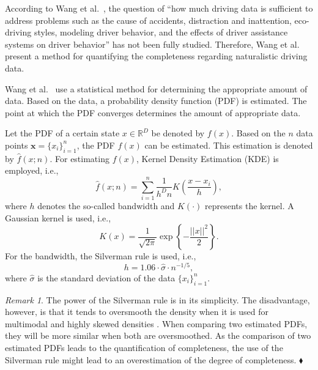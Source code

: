 \documentclass[10pt,final,a4paper,oneside,onecolumn]{article}
\newcommand*{\etal}{et al.}                                     %
\theoremstyle{plain}\newtheorem{definition}{Definition}[section]    %
\theoremstyle{definition}\newtheorem{example}{Example}[section]     %
\theoremstyle{remark}\newtheorem{remarkenv}{Remark}[section]        %
\newenvironment{remark}{\begin{remarkenv}}%
                       {\hfill$\blacklozenge$\end{remarkenv}}       %
\begin{document}
According to Wang \etal\ \cite{wang2017much}, the question of ``how much driving data is sufficient to address problems such as the cause of accidents, distraction and inattention, eco-driving styles, modeling driver behavior, and the effects of driver assistance systems on driver behavior'' has not been fully studied. Therefore, Wang \etal\ \cite{wang2017much} present a method for quantifying the completeness regarding naturalistic driving data. 

Wang \etal\ \cite{wang2017much} use a statistical method for determining the appropriate amount of data. Based on the data, a probability density function (PDF) is estimated. The point at which the PDF converges determines the amount of appropriate data. 

Let the PDF of a certain state $x \in \mathds{R}^D$ be denoted by $f(x)$. Based on the $n$ data points $\textbf{x}=\{x_i\}_{i=1}^n$, the PDF $f(x)$ can be estimated. This estimation is denoted by $\hat{f}(x;n)$. For estimating $f(x)$, Kernel Density Estimation (KDE) \cite{rosenblatt1956remarks, parzen1962estimation} is employed, i.e.,
\begin{equation} \label{eq:kde}
	\hat{f}(x;n) = \sum_{i=1}^n \frac{1}{h^D n} K \left( \frac{x - x_i}{h} \right),
\end{equation}
where $h$ denotes the so-called bandwidth and $K(\cdot)$ represents the kernel. A Gaussian kernel is used, i.e.,
\begin{equation}
	K(x) = \frac{1}{\sqrt{2\pi}} \exp \left\{ -\frac{||x||^2}{2}\right\}.
\end{equation}
For the bandwidth, the Silverman rule \cite{silverman1986density} is used, i.e., 
\begin{equation} \label{eq:silverman}
	h=1.06\cdot\hat{\sigma}\cdot n^{-1/5},
\end{equation}
where $\hat{\sigma}$ is the standard deviation of the data $\{x_i\}_{i=1}^n$.

\begin{remark}
	The power of the Silverman rule is in its simplicity. The disadvantage, however, is that it tends to oversmooth the density when it is used for multimodal and highly skewed densities \cite{silverman1986density}. When comparing two estimated PDFs, they will be more similar when both are oversmoothed. As the comparison of two estimated PDFs leads to the quantification of completeness, the use of the Silverman rule might lead to an overestimation of the degree of completeness.
\end{remark}
\end{document}
